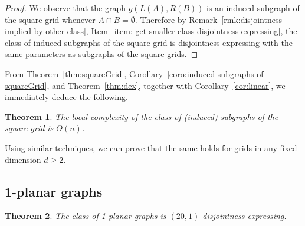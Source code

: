 \documentclass[a4paper,reqno, 12pt]{amsart}
\newtheorem{theorem}{Theorem}[section]
\begin{document}
\begin{proof}
We observe that the graph $g(L(A), R(B))$ is an induced subgraph of the square grid whenever $A\cap B=\emptyset$. Therefore by Remark~\ref{rmk:disjointness implied by other class}, Item~\ref{item: get smaller class disjointness-expressing}, the class of induced subgraphs of the square grid is disjointness-expressing with the same parameters as subgraphs of the square grids.
\end{proof}


From Theorem~\ref{thm:squareGrid}, Corollary~\ref{coro:induced subgraphs
  of squareGrid}, and Theorem~\ref{thm:dex}, together with Corollary~\ref{cor:linear}, we immediately deduce the following.



\begin{theorem}
The local complexity of the class of (induced) subgraphs of the square
grid is $\Theta(n)$.
\end{theorem}

Using similar techniques, we can prove that the same holds for grids in any fixed dimension
$d\ge 2$.

\subsection{1-planar graphs}


\begin{theorem}\label{thm:1planar}
The class of 1-planar graphs is $(20, 1)$-disjointness-expressing.
\end{theorem}
\end{document}
